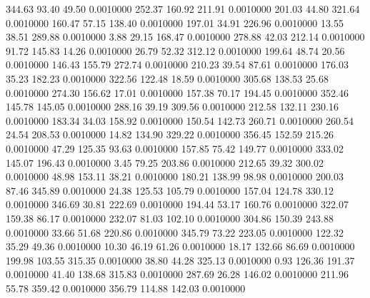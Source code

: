  344.63   93.40   49.50   0.0010000
 252.37  160.92  211.91   0.0010000
 201.03   44.80  321.64   0.0010000
 160.47   57.15  138.40   0.0010000
 197.01   34.91  226.96   0.0010000
  13.55   38.51  289.88   0.0010000
   3.88   29.15  168.47   0.0010000
 278.88   42.03  212.14   0.0010000
  91.72  145.83   14.26   0.0010000
  26.79   52.32  312.12   0.0010000
 199.64   48.74   20.56   0.0010000
 146.43  155.79  272.74   0.0010000
 210.23   39.54   87.61   0.0010000
 176.03   35.23  182.23   0.0010000
 322.56  122.48   18.59   0.0010000
 305.68  138.53   25.68   0.0010000
 274.30  156.62   17.01   0.0010000
 157.38   70.17  194.45   0.0010000
 352.46  145.78  145.05   0.0010000
 288.16   39.19  309.56   0.0010000
 212.58  132.11  230.16   0.0010000
 183.34   34.03  158.92   0.0010000
 150.54  142.73  260.71   0.0010000
 260.54   24.54  208.53   0.0010000
  14.82  134.90  329.22   0.0010000
 356.45  152.59  215.26   0.0010000
  47.29  125.35   93.63   0.0010000
 157.85   75.42  149.77   0.0010000
 333.02  145.07  196.43   0.0010000
   3.45   79.25  203.86   0.0010000
 212.65   39.32  300.02   0.0010000
  48.98  153.11   38.21   0.0010000
 180.21  138.99   98.98   0.0010000
 200.03   87.46  345.89   0.0010000
  24.38  125.53  105.79   0.0010000
 157.04  124.78  330.12   0.0010000
 346.69   30.81  222.69   0.0010000
 194.44   53.17  160.76   0.0010000
 322.07  159.38   86.17   0.0010000
 232.07   81.03  102.10   0.0010000
 304.86  150.39  243.88   0.0010000
  33.66   51.68  220.86   0.0010000
 345.79   73.22  223.05   0.0010000
 122.32   35.29   49.36   0.0010000
  10.30   46.19   61.26   0.0010000
  18.17  132.66   86.69   0.0010000
 199.98  103.55  315.35   0.0010000
  38.80   44.28  325.13   0.0010000
   0.93  126.36  191.37   0.0010000
  41.40  138.68  315.83   0.0010000
 287.69   26.28  146.02   0.0010000
 211.96   55.78  359.42   0.0010000
 356.79  114.88  142.03   0.0010000
